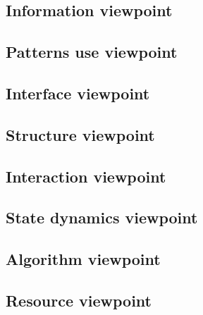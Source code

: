 \documentclass[10pt,journal,compsoc,onecolumn, draftclsnofoot]{IEEEtran}
\begin{document}
\subsection{Information viewpoint}
\subsection{Patterns use viewpoint}
\subsection{Interface viewpoint}
\subsection{Structure viewpoint}
\subsection{Interaction viewpoint}
\subsection{State dynamics viewpoint}
\subsection{Algorithm viewpoint}
\subsection{Resource viewpoint}



\end{document}
